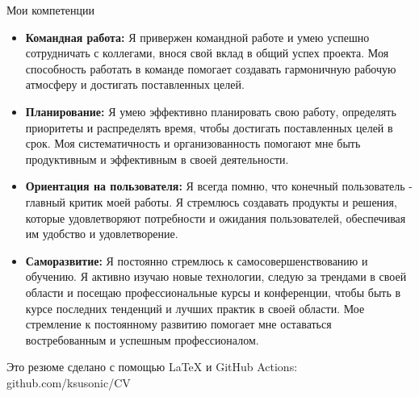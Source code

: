 \documentclass[a4paper,10pt]{article}
\newlength{\cvcolumngapwidth}
\newlength{\cvleftcolumnwidth}
\newlength{\cvrightcolumnwidth}
\newcommand{\cvheadingstyle}[1]{{\normalsize\cvheadingfont\textcolor{cvheadingcolor}{#1}}}
\newlength{\cvafteritemskipamount}
\newlength{\cvparskip}
\newcommand{\cvitem}[2]{
    \begin{minipage}[t]{\cvleftcolumnwidth}
        \raggedleft #1
    \end{minipage}%
    \hspace{\cvcolumngapwidth}%
    \begin{minipage}[t]{\cvrightcolumnwidth}
        \setlength{\parskip}{\cvparskip} #2
    \end{minipage}

    \vspace{\cvafteritemskipamount}
}
\begin{document}
\cvitem{
    \cvheadingstyle{Мои компетенции}
}{
    \begin{itemize}[leftmargin=0.5cm, label={}]
        \item {\textbf{Командная работа:} Я привержен командной работе и умею успешно сотрудничать с коллегами, внося свой вклад в общий успех проекта. Моя способность работать в команде помогает создавать гармоничную рабочую атмосферу и достигать поставленных целей.}
        \item {\textbf{Планирование:} Я умею эффективно планировать свою работу, определять приоритеты и распределять время, чтобы достигать поставленных целей в срок. Моя систематичность и организованность помогают мне быть продуктивным и эффективным в своей деятельности.}
        \item {\textbf{Ориентация на пользователя:} Я всегда помню, что конечный пользователь - главный критик моей работы. Я стремлюсь создавать продукты и решения, которые удовлетворяют потребности и ожидания пользователей, обеспечивая им удобство и удовлетворение.}
        \item {\textbf{Саморазвитие:} Я постоянно стремлюсь к самосовершенствованию и обучению. Я активно изучаю новые технологии, следую за трендами в своей области и посещаю профессиональные курсы и конференции, чтобы быть в курсе последних тенденций и лучших практик в своей области. Мое стремление к постоянному развитию помогает мне оставаться востребованным и успешным профессионалом.}
    \end{itemize}
}

Это резюме сделано с помощью LaTeX и GitHub Actions: github.com/ksusonic/CV
\end{document}
